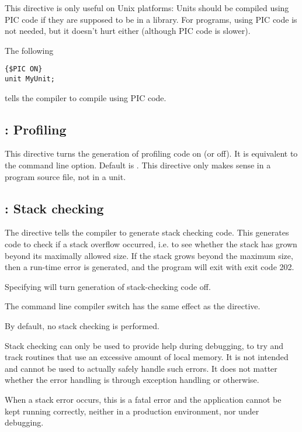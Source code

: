 This directive is only useful on Unix platforms: Units should be compiled 
using PIC code if they are supposed to be in a library. For programs, using
PIC code is not needed, but it doesn't hurt either (although PIC code is
slower).

The following 
\begin{verbatim}
{$PIC ON}
unit MyUnit;
\end{verbatim}
tells the compiler to compile  using PIC code.

\subsection{ : Profiling}

This directive turns the generation of profiling code on (or off). It is
equivalent to the  command line option. Default is . This
directive only makes sense in a program source file, not in a unit.


\subsection{ : Stack checking}

The  directive tells the compiler to generate stack checking
code. This generates code to check if a stack overflow occurred, i.e. to see
whether the stack has grown beyond its maximally allowed size. If the stack
grows beyond the maximum size, then a run-time error is generated, and the
program will exit with exit code 202.

Specifying  will turn generation of stack-checking code off.

The command line compiler switch  has the same effect as the
 directive.

By default, no stack checking is performed.

\begin{remark}
Stack checking can only be used to provide help during debugging, to try and 
track routines that use an excessive amount of local memory. It is not
intended and cannot be used to actually safely handle such errors.
It does not matter whether the error handling is through exception 
handling or otherwise.

When a stack error occurs, this is a fatal error and the application cannot 
be kept running correctly, neither in a production environment, nor under 
debugging. 
\end{remark}

